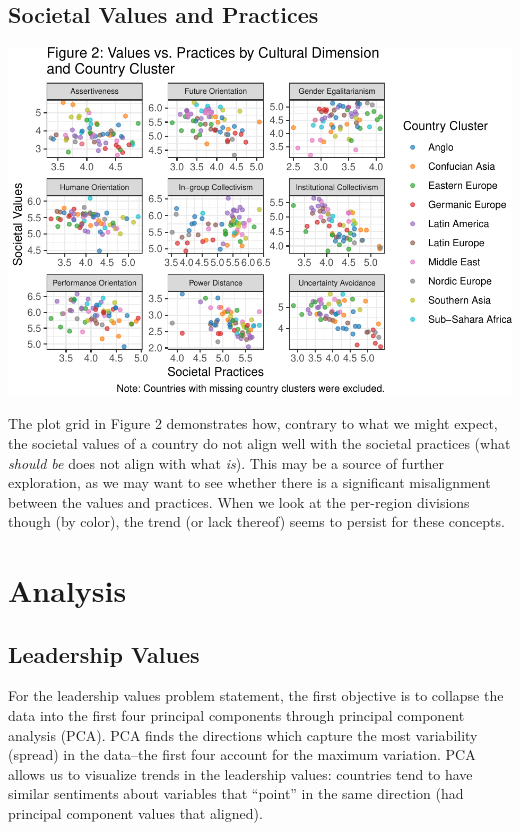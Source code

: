\documentclass[
]{article}
\begin{document}
\hypertarget{societal-values-and-practices}{%
\subsection{Societal Values and
Practices}\label{societal-values-and-practices}}

\begin{center}\includegraphics[width=0.95\linewidth]{globe_report_files/figure-latex/society-1} \end{center}

The plot grid in Figure 2 demonstrates how, contrary to what we might
expect, the societal values of a country do not align well with the
societal practices (what \emph{should be} does not align with what
\emph{is}). This may be a source of further exploration, as we may want
to see whether there is a significant misalignment between the values
and practices. When we look at the per-region divisions though (by
color), the trend (or lack thereof) seems to persist for these concepts.

\hypertarget{analysis}{%
\section{Analysis}\label{analysis}}

\hypertarget{leadership-values}{%
\subsection{Leadership Values}\label{leadership-values}}

For the leadership values problem statement, the first objective is to
collapse the data into the first four principal components through
principal component analysis (PCA). PCA finds the directions which
capture the most variability (spread) in the data--the first four
account for the maximum variation. PCA allows us to visualize trends in
the leadership values: countries tend to have similar sentiments about
variables that ``point'' in the same direction (had principal component
values that aligned).
\end{document}
